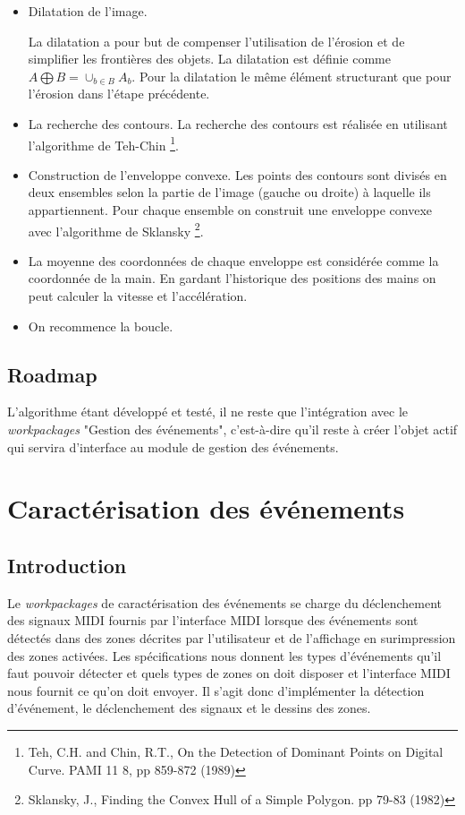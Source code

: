\begin{itemize}
\item Dilatation de l'image.
\par La dilatation a pour but de compenser l'utilisation de l'érosion et de simplifier les frontières des objets. La dilatation est définie comme $A \bigoplus B = \cup_{b \in B}A_b$. Pour la dilatation le même élément structurant que pour l'érosion dans l'étape précédente. 
\item La recherche des contours. La recherche des contours est réalisée en utilisant l'algorithme de Teh-Chin \footnote{Teh, C.H. and Chin, R.T., On the Detection of Dominant Points on Digital Curve. PAMI 11 8, pp 859-872 (1989)}.
\item Construction de l'enveloppe convexe. Les points des contours sont divisés en deux ensembles selon la partie de l'image (gauche ou droite) à laquelle ils appartiennent. Pour chaque ensemble on construit une enveloppe convexe avec l'algorithme de Sklansky \footnote{Sklansky, J., Finding the Convex Hull of a Simple Polygon. pp 79-83 (1982)
}.
\item La moyenne des coordonnées de chaque enveloppe est considérée comme la coordonnée de la main. En gardant l'historique des positions des mains on peut calculer la vitesse et l'accélération. 
\item On recommence la boucle.
\end{itemize}
\subsection*{Roadmap}
\par L'algorithme étant développé et testé, il ne reste que l'intégration avec le \emph{workpackages} "Gestion des événements", c'est-à-dire qu'il reste à créer l'objet actif qui servira d'interface au module de gestion des événements.



\section{Caractérisation des événements}
\subsection{Introduction}
\par Le \emph{workpackages} de caractérisation des événements se charge du déclenchement des signaux MIDI fournis par l'interface MIDI lorsque des événements sont détectés dans des zones décrites par l'utilisateur et de l'affichage en surimpression des zones activées. Les spécifications nous donnent les types d'événements qu'il faut pouvoir détecter et quels types de zones on doit disposer et l'interface MIDI nous fournit ce qu'on doit envoyer. Il s'agit donc d'implémenter la détection d'événement, le déclenchement des signaux et le dessins des zones.
